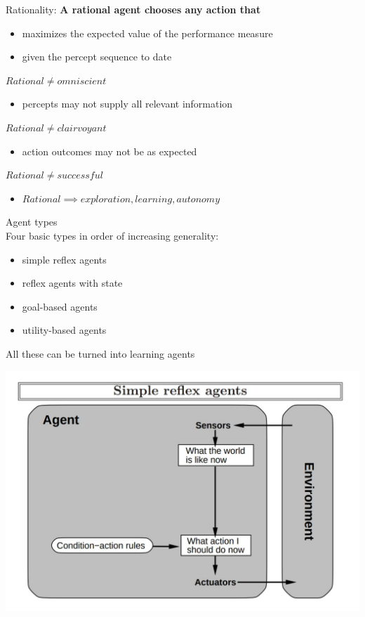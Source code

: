 \documentclass{beamer}
\begin{document}
	\begin{frame}
		Rationality:
		\textbf{A rational agent chooses any action that}
		\begin{itemize}
			\item maximizes the expected value of the performance measure
			\item given the percept sequence to date
		\end{itemize}
		$Rational \neq omniscient$
		\begin{itemize}
			\item  percepts may not supply all relevant information
		\end{itemize}
		$Rational \neq clairvoyant$
		\begin{itemize}
			\item  action outcomes may not be as expected
		\end{itemize}
		$Rational \neq successful$
		\begin{itemize}
			\item $Rational \implies exploration, learning, autonomy$
		\end{itemize}
	\end{frame}
	\begin{frame}
		Agent types \\
		Four basic types in order of increasing generality:\\
		\begin{itemize}
			\item simple reflex agents
			\item reflex agents with state
			\item goal-based agents
			\item utility-based agents
		\end{itemize}
	All these can be turned into learning agents
	\end{frame}

	\begin{frame}
	\centering
		\includegraphics[scale=0.21]{a1.jpeg}
	\end{frame}
\end{document}
